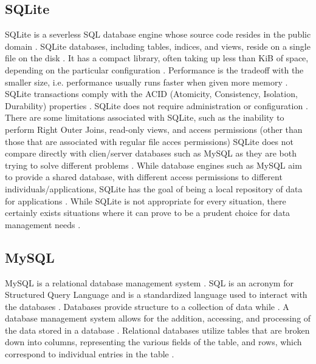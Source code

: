      \pv



\subsection{SQLite}

     SQLite is a severless SQL database engine whose source code
     resides in the public domain \cite{sqliteabout}. SQLite
     databases, including tables, indices, and views, reside on a
     single file on the disk \cite{sqliteabout}. It has a compact
     library, often taking up less than KiB of space, depending on the
     particular configuration \cite{sqliteabout}. Performance is the
     tradeoff with the smaller size, i.e. performance usually runs
     faster when given more memory \cite{sqliteabout}. SQLite
     transactions comply with the ACID (Atomicity, Consistency,
     Isolation, Durability) properties
     \cite{sqliteabout} \cite{acid}. SQLite does not require administration or
     configuration \cite{sqliteover}. There are some limitations
     associated with SQLite, such as the inability to perform Right
     Outer Joins, read-only views, and access permissions (other than
     those that are associated with regular file acces permissions)
     SQLite does not compare directly with
     clien/server databases such as MySQL as they are both trying to
     solve different problems \cite{sqlitewhentouse} \cite{sqliteover}.
     While database
     engines such as MySQL aim to provide a shared database, with
     different access permissions to different
     individuals/applications, SQLite has the goal of being a local
     repository of data for applications \cite{sqlitewhentouse}. While
     SQLite is not appropriate for every situation, there certainly
     exists situations where it can prove to be a prudent choice for
     data management needs \cite{sqlitewhentouse}.

     \pv
     
\subsection{MySQL}

     MySQL is a relational database management system \cite{devmysql}. SQL
     is an acronym for Structured Query Language and is a standardized
     language used to interact with the databases \cite{devmysql}.
     Databases provide structure to a collection of data
     while \cite{devmysql}. A database management system allows for the
     addition, accessing, and processing of the data stored in a
     database \cite{devmysql}. Relational databases utilize tables that are
     broken down into columns, representing the various fields of the
     table, and rows, which correspond to individual entries in the
     table \cite{howmysql}.


